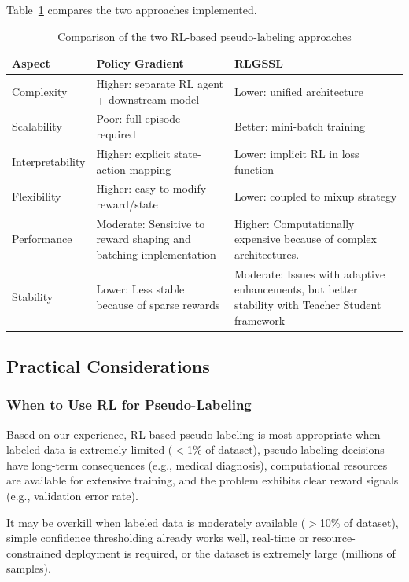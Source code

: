 \documentclass{scrartcl}
\begin{document}
Table~\ref{tab:approach_comparison} compares the two approaches implemented.

\begin{table}[H]
    \centering
    \begin{tabular}{p{3cm}p{5cm}p{5cm}}
        \hline
        \textbf{Aspect} & \textbf{Policy Gradient} & \textbf{RLGSSL} \\
        \hline
        Complexity & Higher: separate RL agent + downstream model & Lower: unified architecture \\
        Scalability & Poor: full episode required & Better: mini-batch training \\
        Interpretability & Higher: explicit state-action mapping & Lower: implicit RL in loss function \\
        Flexibility & Higher: easy to modify reward/state & Lower: coupled to mixup strategy \\
        Performance & Moderate: Sensitive to reward shaping and batching implementation & Higher: Computationally expensive because of complex architectures. \\
        Stability & Lower: Less stable because of sparse rewards & Moderate: Issues with adaptive enhancements, but better stability with Teacher Student framework \\
        \hline
    \end{tabular}
    \caption{Comparison of the two RL-based pseudo-labeling approaches}
    \label{tab:approach_comparison}
\end{table}

\subsection{Practical Considerations}

\subsubsection{When to Use RL for Pseudo-Labeling}

Based on our experience, RL-based pseudo-labeling is most appropriate when labeled data is extremely limited ($<$1\% of dataset), pseudo-labeling decisions have long-term consequences (e.g., medical diagnosis), computational resources are available for extensive training, and the problem exhibits clear reward signals (e.g., validation error rate).

It may be overkill when labeled data is moderately available ($>$10\% of dataset), simple confidence thresholding already works well, real-time or resource-constrained deployment is required, or the dataset is extremely large (millions of samples).
\end{document}
